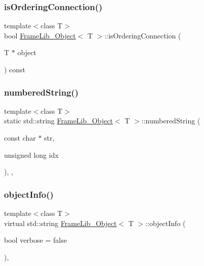 \subsubsection{\texorpdfstring{is\+Ordering\+Connection()}{isOrderingConnection()}}
{\footnotesize\ttfamily template$<$class T$>$ \\
bool \hyperlink{class_frame_lib___object}{Frame\+Lib\+\_\+\+Object}$<$ T $>$\+::is\+Ordering\+Connection (\begin{DoxyParamCaption}\item[{T $\ast$}]{object }\end{DoxyParamCaption}) const\hspace{0.3cm}{\ttfamily [inline]}}

\mbox{\label{class_frame_lib___object_a26307f11e68962614da4178115e665b7}} 
\subsubsection{\texorpdfstring{numbered\+String()}{numberedString()}}
{\footnotesize\ttfamily template$<$class T$>$ \\
static std\+::string \hyperlink{class_frame_lib___object}{Frame\+Lib\+\_\+\+Object}$<$ T $>$\+::numbered\+String (\begin{DoxyParamCaption}\item[{const char $\ast$}]{str,  }\item[{unsigned long}]{idx }\end{DoxyParamCaption})\hspace{0.3cm}{\ttfamily [inline]}, {\ttfamily [static]}, {\ttfamily [protected]}}

\mbox{\label{class_frame_lib___object_a10d673de9a3c59ace6a22ba1cff313c8}} 
\subsubsection{\texorpdfstring{object\+Info()}{objectInfo()}}
{\footnotesize\ttfamily template$<$class T$>$ \\
virtual std\+::string \hyperlink{class_frame_lib___object}{Frame\+Lib\+\_\+\+Object}$<$ T $>$\+::object\+Info (\begin{DoxyParamCaption}\item[{bool}]{verbose = {\ttfamily false} }\end{DoxyParamCaption})\hspace{0.3cm}{\ttfamily [inline]}, {\ttfamily [virtual]}}



